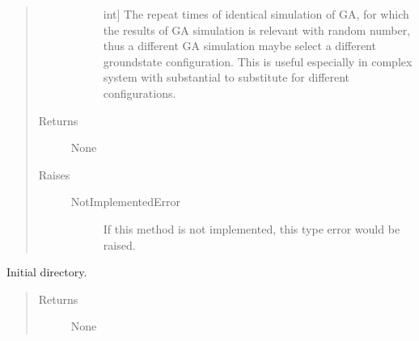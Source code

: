 \documentclass[letterpaper,10pt,english]{sphinxmanual}
\begin{document}
\begin{fulllineitems}
\begin{fulllineitems}
\begin{quote}
\begin{description}
\begin{description}
\item[{}] \leavevmode{[}int{]}
\sphinxAtStartPar
The repeat times of identical simulation of GA, for which the
results of GA simulation is relevant with random number, thus
a different GA simulation maybe select a different ground\sphinxhyphen{}state
configuration. This is useful especially in complex system with
substantial  to substitute for different configurations.

\end{description}

\item[{Returns}] \leavevmode\begin{description}
\item[{None}] \leavevmode
\end{description}

\item[{Raises}] \leavevmode\begin{description}
\item[{NotImplementedError}] \leavevmode
\sphinxAtStartPar
If this method is not implemented, this type error would be raised.

\end{description}

\end{description}\end{quote}

\end{fulllineitems}


\begin{fulllineitems}
\label{\detokenize{pygace:pygace.gace.AbstractApp.set_dir}}
\sphinxAtStartPar
Initial directory.
\begin{quote}\begin{description}
\item[{Returns}] \leavevmode\begin{description}
\item[{None}] \leavevmode
\end{description}

\end{description}\end{quote}

\end{fulllineitems}


\end{fulllineitems}
\end{document}
